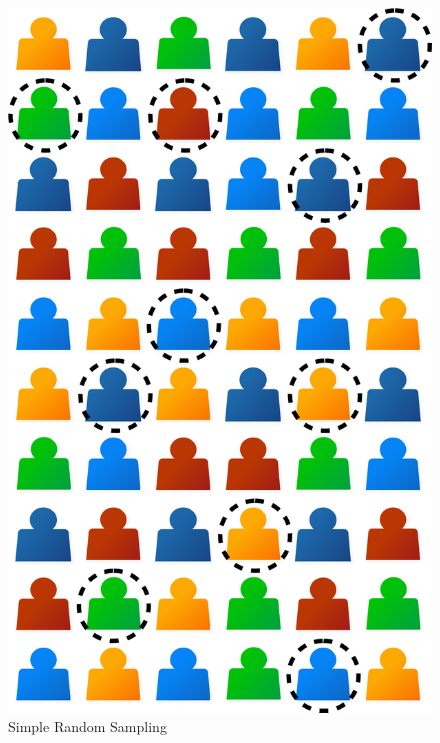 \begin{figure}[H]
	\centering
	\includegraphics[width=\maxwidth{.35\linewidth}]{gfx/07-02}
	\caption{Simple Random Sampling}
	\label{07:fig02}
\end{figure}

